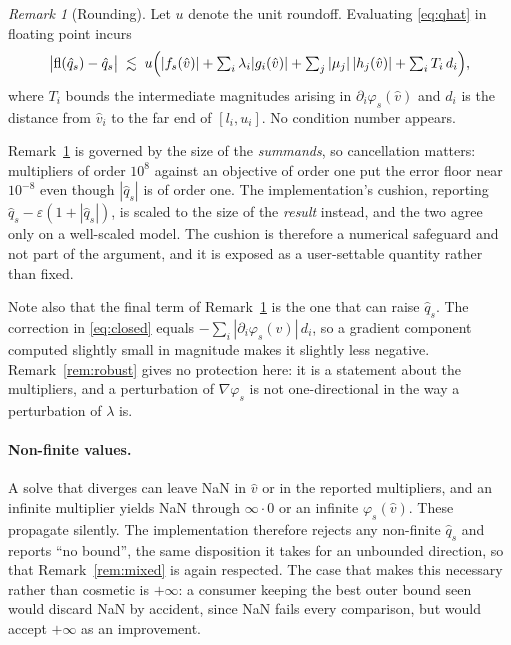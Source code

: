 \documentclass[11pt]{article}
\theoremstyle{plain}
\theoremstyle{remark}
\newtheorem{remark}[lemma]{Remark}
\newcommand{\vhat}{\hat{v}}
\newcommand{\qhat}{\hat{q}}
\begin{document}
\begin{remark}[Rounding]\label{rem:rounding}
Let $u$ denote the unit roundoff.  Evaluating \eqref{eq:qhat} in floating point
incurs
\[
  \bigl| \mathrm{fl}(\qhat_s) - \qhat_s \bigr|
  \;\lesssim\;
  u \Bigl( |f_s(\vhat)|
         + \textstyle\sum_i \lambda_i |g_i(\vhat)|
         + \sum_j |\mu_j|\,|h_j(\vhat)|
         + \sum_i T_i \, d_i \Bigr),
\]
where $T_i$ bounds the intermediate magnitudes arising in
$\partial_i \varphi_s(\vhat)$ and $d_i$ is the distance from $\vhat_i$ to the
far end of $[l_i, u_i]$.  No condition number appears.
\end{remark}

Remark~\ref{rem:rounding} is governed by the size of the \emph{summands}, so
cancellation matters: multipliers of order $10^{8}$ against an objective of
order one put the error floor near $10^{-8}$ even though $|\qhat_s|$ is of order
one.  The implementation's cushion, reporting
$\qhat_s - \varepsilon(1 + |\qhat_s|)$, is scaled to the size of the
\emph{result} instead, and the two agree only on a well-scaled model.  The
cushion is therefore a numerical safeguard and not part of the argument, and it
is exposed as a user-settable quantity rather than fixed.

Note also that the final term of Remark~\ref{rem:rounding} is the one that can
raise $\qhat_s$.  The correction in \eqref{eq:closed} equals
$-\sum_i |\partial_i \varphi_s(\vhat)|\, d_i$, so a gradient component computed
slightly small in magnitude makes it slightly less negative.  Remark~\ref{rem:robust}
gives no protection here: it is a statement about the multipliers, and a
perturbation of $\nabla \varphi_s$ is not one-directional in the way a
perturbation of $\lambda$ is.

\paragraph{Non-finite values.}
A solve that diverges can leave NaN in $\vhat$ or in the reported multipliers,
and an infinite multiplier yields NaN through $\infty \cdot 0$ or an infinite
$\varphi_s(\vhat)$.  These propagate silently.  The implementation therefore
rejects any non-finite $\qhat_s$ and reports ``no bound'', the same disposition
it takes for an unbounded direction, so that Remark~\ref{rem:mixed} is again
respected.  The case that makes this necessary rather than cosmetic is
$+\infty$: a consumer keeping the best outer bound seen would discard NaN by
accident, since NaN fails every comparison, but would accept $+\infty$ as an
improvement.
\end{document}
